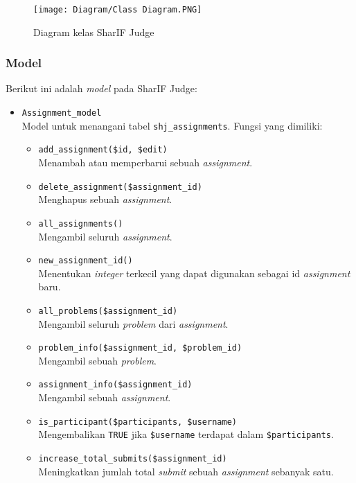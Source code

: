     \begin{figure}[H]
    	\centering  
    	\texttt{[image: Diagram/Class Diagram.PNG]}  
    	\caption{Diagram kelas SharIF Judge}
    	\label{fig:3:classdiagram} 
    \end{figure} 


\subsubsection{Model}

Berikut ini adalah \textit{model} pada SharIF Judge:

\begin{itemize}
	\item \verb|Assignment_model| \\ Model untuk menangani tabel \verb|shj_assignments|. Fungsi yang dimiliki:
	\begin{itemize}
		\item \verb|add_assignment($id, $edit)|\\ Menambah atau memperbarui sebuah \textit{assignment}.
		\item \verb|delete_assignment($assignment_id)| \\ Menghapus sebuah \textit{assignment}.
		\item \verb|all_assignments()| \\ Mengambil seluruh \textit{assignment}.
		\item \verb|new_assignment_id()| \\ Menentukan \textit{integer} terkecil yang dapat digunakan sebagai id \textit{assignment} baru.
		\item \verb|all_problems($assignment_id)| \\ Mengambil seluruh \textit{problem} dari \textit{assignment}.
		\item \verb|problem_info($assignment_id, $problem_id)| \\ Mengambil sebuah \textit{problem}.
		\item \verb|assignment_info($assignment_id)| \\ Mengambil sebuah \textit{assignment}.
		\item \verb|is_participant($participants, $username)| \\ Mengembalikan \verb|TRUE| jika \verb|$username| terdapat dalam \verb|$participants|.
		\item \verb|increase_total_submits($assignment_id)| \\ Meningkatkan jumlah total \textit{submit} sebuah \textit{assignment} sebanyak satu.

\end{itemize}
\end{itemize}

